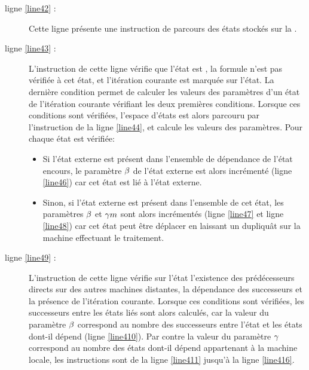 \begin{description}
	\item[ligne \ref{line42} :]  Cette ligne présente une instruction de parcours des états stockés sur la \mi{}.
	\item[ligne \ref{line43} :]  L'instruction de cette ligne vérifie que l'état est , la formule n'est pas vérifiée à cet état, et l'itération courante est marquée sur l'état. La dernière condition permet de calculer les valeurs des paramètres d'un état de l'itération courante vérifiant les deux premières conditions. Lorsque ces conditions sont vérifiées, l'espace d'états est alors parcouru par l'instruction de la ligne \ref{line44}, et calcule les valeurs des paramètres. Pour chaque état est vérifiée:
	
	\begin{itemize}
	\item Si l'état externe est présent dans l'ensemble de dépendance de l'état encours, le paramètre $\beta{}$ de l'état externe est alors incrémenté (ligne \ref{line46}) car cet état est lié à l'état externe.
	\item Sinon, si l'état externe est présent dans l'ensemble  de cet état, les paramètres $\beta{}$ et $  \gamma m{}$ sont alors incrémentés (ligne \ref{line47} et ligne \ref{line48}) car cet état peut être déplacer en laissant un dupliquât sur la machine effectuant le traitement.  
	\end{itemize}
	
	\item[ligne \ref{line49} :] L'instruction de cette ligne vérifie sur l'état l'existence des prédécesseurs directs sur des autres machines distantes, la dépendance des successeurs et la présence de l'itération courante. Lorsque ces conditions sont vérifiées, les successeurs  entre les états liés sont alors calculés, car la valeur du paramètre $\beta{}$ correspond au nombre des successeurs entre l'état et les états dont-il dépend (ligne \ref{line410}). Par contre la valeur du paramètre $\gamma{}$ correspond au nombre des états dont-il dépend appartenant à la machine locale, les instructions sont de la ligne \ref{line411} jusqu'à la ligne \ref{line416}.
\end{description}

